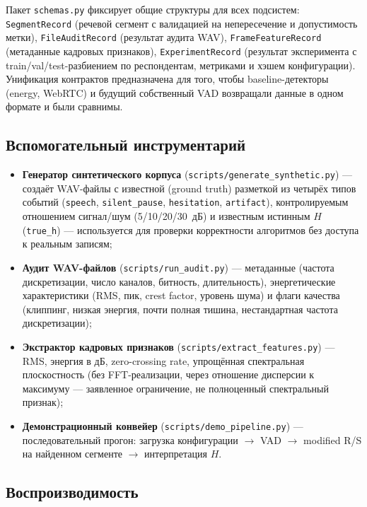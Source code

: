 \documentclass[12pt,a4paper]{article}
\begin{document}
Пакет \texttt{schemas.py} фиксирует общие структуры для всех подсистем:
\texttt{SegmentRecord} (речевой сегмент с валидацией на непересечение и
допустимость метки), \texttt{FileAuditRecord} (результат аудита WAV),
\texttt{FrameFeatureRecord} (метаданные кадровых признаков),
\texttt{ExperimentRecord} (результат эксперимента с train/val/test-разбиением
по респондентам, метриками и хэшем конфигурации). Унификация контрактов
предназначена для того, чтобы baseline-детекторы (energy, WebRTC) и
будущий собственный VAD возвращали данные в одном формате и были сравнимы.

\subsection{Вспомогательный инструментарий}

\begin{itemize}
  \item \textbf{Генератор синтетического корпуса}
    (\texttt{scripts/generate\_synthetic.py}) — создаёт WAV-файлы с
    известной (ground truth) разметкой из четырёх типов событий
    (\texttt{speech}, \texttt{silent\_pause}, \texttt{hesitation},
    \texttt{artifact}), контролируемым отношением сигнал/шум (5/10/20/30~дБ)
    и известным истинным $H$ (\texttt{true\_h}) — используется для проверки
    корректности алгоритмов без доступа к реальным записям;
  \item \textbf{Аудит WAV-файлов} (\texttt{scripts/run\_audit.py}) —
    метаданные (частота дискретизации, число каналов, битность,
    длительность), энергетические характеристики (RMS, пик, crest factor,
    уровень шума) и флаги качества (клиппинг, низкая энергия, почти полная
    тишина, нестандартная частота дискретизации);
  \item \textbf{Экстрактор кадровых признаков}
    (\texttt{scripts/extract\_features.py}) — RMS, энергия в дБ,
    zero-crossing rate, упрощённая спектральная плоскостность (без
    FFT-реализации, через отношение дисперсии к максимуму — заявленное
    ограничение, не полноценный спектральный признак);
  \item \textbf{Демонстрационный конвейер} (\texttt{scripts/demo\_pipeline.py})
    — последовательный прогон: загрузка конфигурации $\to$ VAD $\to$
    modified R/S на найденном сегменте $\to$ интерпретация $H$.
\end{itemize}

\subsection{Воспроизводимость}
\end{document}
